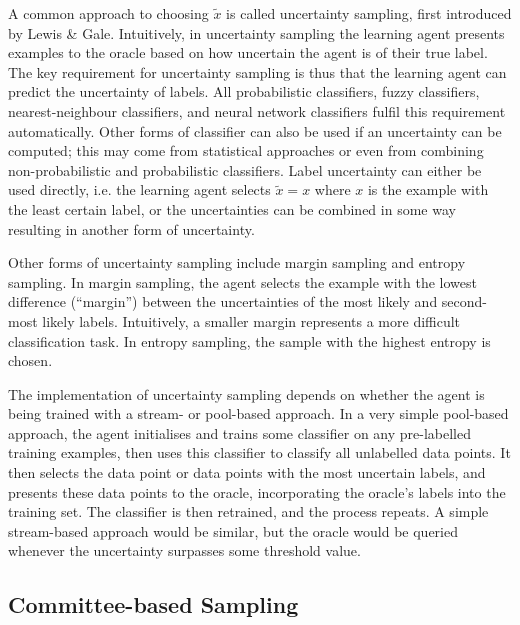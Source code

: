 \documentclass[a4paper]{article}
\begin{document}
            A common approach to choosing $\tilde x$ is called uncertainty sampling, first introduced by Lewis \& Gale\cite{lewis94}. Intuitively, in uncertainty sampling the learning agent presents examples to the oracle based on how uncertain the agent is of their true label. The key requirement for uncertainty sampling is thus that the learning agent can predict the uncertainty of labels. All probabilistic classifiers, fuzzy classifiers, nearest-neighbour classifiers, and neural network classifiers fulfil this requirement automatically\cite{lewis94}. Other forms of classifier can also be used if an uncertainty can be computed; this may come from statistical approaches or even from combining non-probabilistic and probabilistic classifiers\cite{lewis94b}. Label uncertainty can either be used directly, i.e. the learning agent selects $\tilde x = x$ where $x$ is the example with the least certain label\cite{lewis94}, or the uncertainties can be combined in some way resulting in another form of uncertainty.

            Other forms of uncertainty sampling include margin sampling and entropy sampling. In margin sampling, the agent selects the example with the lowest difference (``margin'') between the uncertainties of the most likely and second-most likely labels. Intuitively, a smaller margin represents a more difficult classification task\cite{scheffer01}. In entropy sampling, the sample with the highest entropy is chosen\cite{settles09}.

            The implementation of uncertainty sampling depends on whether the agent is being trained with a stream- or pool-based approach. In a very simple pool-based approach, the agent initialises and trains some classifier on any pre-labelled training examples, then uses this classifier to classify all unlabelled data points. It then selects the data point or data points with the most uncertain labels, and presents these data points to the oracle, incorporating the oracle's labels into the training set. The classifier is then retrained, and the process repeats\cite{lewis94}. A simple stream-based approach would be similar, but the oracle would be queried whenever the uncertainty surpasses some threshold value\cite{loy11,settles09}.

        \subsection{Committee-based Sampling}
\end{document}
